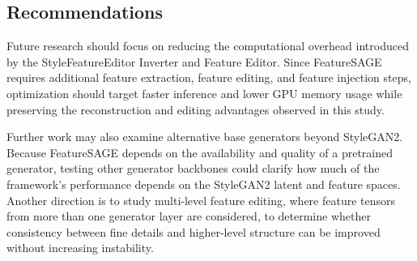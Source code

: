 \subsection{Recommendations}

Future research should focus on reducing the computational overhead introduced by the StyleFeatureEditor Inverter and Feature Editor. Since FeatureSAGE requires additional feature extraction, feature editing, and feature injection steps, optimization should target faster inference and lower GPU memory usage while preserving the reconstruction and editing advantages observed in this study.

Further work may also examine alternative base generators beyond StyleGAN2. Because FeatureSAGE depends on the availability and quality of a pretrained generator, testing other generator backbones could clarify how much of the framework's performance depends on the StyleGAN2 latent and feature spaces. Another direction is to study multi-level feature editing, where feature tensors from more than one generator layer are considered, to determine whether consistency between fine details and higher-level structure can be improved without increasing instability.
